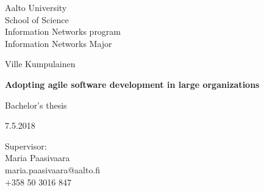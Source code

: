 \begin{titlepage}
    \begin{flushleft}
    \begin{minipage}{15cm}
        \linespread{1.0}\small
        Aalto University\\
        School of Science \\
        Information Networks program \\
        Information Networks Major
        \par
    \end{minipage}
    \end{flushleft}
    \centering
    \vspace{3cm}
    {\Large Ville Kumpulainen \par}
    {\LARGE\bfseries Adopting agile software development in large organizations\par}
    \vspace{5cm}
    \raggedright{}
    {\large Bachelor's thesis\par}
    {\large 7.5.2018}
    \vfill

    \begin{flushleft}
    \begin{minipage}{15cm}
        \linespread{1.0}\small
        Supervisor:\\
        Maria Paasivaara\\
        maria.paasivaara@aalto.fi \\
        +358 50 3016 847 \\
        \par
    \end{minipage}
    \end{flushleft}


\end{titlepage}
